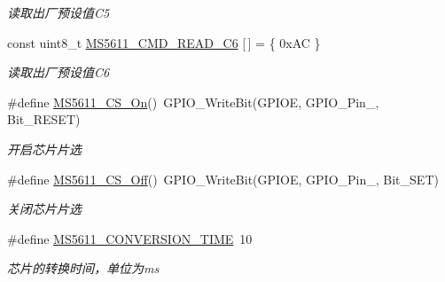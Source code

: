 \begin{DoxyCompactItemize}
\begin{DoxyCompactList}\small\item\em 读取出厂预设值\+C5 \end{DoxyCompactList}\item 
const uint8\+\_\+t \hyperlink{group__ms5611__driver__internal_ga27544c59b693ee1160b49dd80577fedb}{M\+S5611\+\_\+\+C\+M\+D\+\_\+\+R\+E\+A\+D\+\_\+\+C6} \mbox{[}$\,$\mbox{]} = \{ 0x\+A\+C \}\hypertarget{group__ms5611__driver__internal_ga27544c59b693ee1160b49dd80577fedb}{}\label{group__ms5611__driver__internal_ga27544c59b693ee1160b49dd80577fedb}

\begin{DoxyCompactList}\small\item\em 读取出厂预设值\+C6 \end{DoxyCompactList}\item 
\#define \hyperlink{group__ms5611__driver__internal_ga290d6db5c529c90aa2dc855623f55b78}{M\+S5611\+\_\+\+C\+S\+\_\+\+On}()~G\+P\+I\+O\+\_\+\+Write\+Bit(G\+P\+I\+OE, G\+P\+I\+O\+\_\+\+Pin\+\_, Bit\+\_\+\+R\+E\+S\+ET)\hypertarget{group__ms5611__driver__internal_ga290d6db5c529c90aa2dc855623f55b78}{}\label{group__ms5611__driver__internal_ga290d6db5c529c90aa2dc855623f55b78}

\begin{DoxyCompactList}\small\item\em 开启芯片片选 \end{DoxyCompactList}\item 
\#define \hyperlink{group__ms5611__driver__internal_ga132d44bdafc80a7ef5259734dc4547c2}{M\+S5611\+\_\+\+C\+S\+\_\+\+Off}()~G\+P\+I\+O\+\_\+\+Write\+Bit(G\+P\+I\+OE, G\+P\+I\+O\+\_\+\+Pin\+\_, Bit\+\_\+\+S\+ET)\hypertarget{group__ms5611__driver__internal_ga132d44bdafc80a7ef5259734dc4547c2}{}\label{group__ms5611__driver__internal_ga132d44bdafc80a7ef5259734dc4547c2}

\begin{DoxyCompactList}\small\item\em 关闭芯片片选 \end{DoxyCompactList}\item 
\#define \hyperlink{group__ms5611__driver__internal_gabae8b9d1a17f48b416cc3881bb954ca2}{M\+S5611\+\_\+\+C\+O\+N\+V\+E\+R\+S\+I\+O\+N\+\_\+\+T\+I\+ME}~10\hypertarget{group__ms5611__driver__internal_gabae8b9d1a17f48b416cc3881bb954ca2}{}\label{group__ms5611__driver__internal_gabae8b9d1a17f48b416cc3881bb954ca2}

\begin{DoxyCompactList}\small\item\em 芯片的转换时间，单位为ms \end{DoxyCompactList}\end{DoxyCompactItemize}


